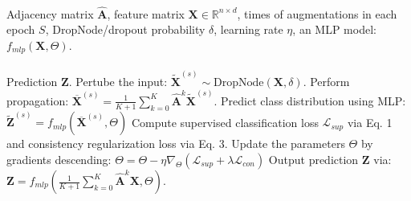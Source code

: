  \begin{algorithm}[t]
\caption{\model}
\small
\label{alg:2}
\begin{algorithmic}[1] \REQUIRE ~~\\
 Adjacency matrix $\hat{\mathbf{A}}$,
feature matrix $\mathbf{X} \in \mathbb{R}^{n \times d}$, 
times of augmentations in each epoch $S$, DropNode/dropout probability $\delta$, learning rate $\eta$, an MLP model: $f_{mlp}(\mathbf{X}, \Theta)$.\\
\ENSURE ~~\\
Prediction $\mathbf{Z}$. 
\STATE Pertube the input:  $\widetilde{\mathbf{X}}^{(s)} \sim \text{DropNode}(\mathbf{X},\delta)$. 
\STATE Perform propagation: $\overline{\mathbf{X}}^{(s)} = \frac{1}{K+1}\sum_{k=0}^K\hat{\mathbf{A}}^k \widetilde{\mathbf{X}}^{(s)}$.
\STATE Predict class distribution using MLP: $\widetilde{\mathbf{Z}}^{(s)} = f_{mlp}(\mathbf{\overline{X}}^{(s)}, \Theta)$
\ENDFOR
\STATE Compute supervised classification loss $\mathcal{L}_{sup}$ via Eq. 1 and consistency regularization loss via Eq. 3.
\STATE Update the parameters $\Theta$ by gradients descending:
$\Theta = \Theta - \eta \nabla_\Theta (\mathcal{L}_{sup} + \lambda \mathcal{L}_{con})$
\ENDWHILE
\STATE Output prediction $\mathbf{Z}$ via: $\mathbf{Z}= f_{mlp}(\frac{1}{K+1}\sum_{k=0}^K\hat{\mathbf{A}}^k \mathbf{X}, \Theta)$.

\end{algorithmic}
\end{algorithm}


















































































